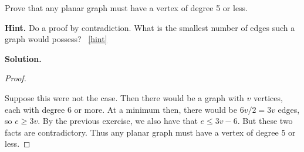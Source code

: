 \documentclass{book}
\begin{document}
\setcounter{project}{31}
\addtocounter{project}{-1}
\begin{activity}[]\label{act-planardeg5}
\hypertarget{p-314}{}%
Prove that any planar graph must have a vertex of degree 5 or less.%
\par\smallskip%
\noindent\textbf{Hint.}\hypertarget{hint-10}{}\quad%
\hypertarget{p-315}{}%
Do a proof by contradiction.  What is the smallest number of edges such a graph would possess?%
~\hfill{\tiny\hyperlink{a-31}{[hint]}\hypertarget{q-31}{}}\par\smallskip%
\noindent\textbf{Solution.}\hypertarget{solution-26}{}\quad%
\begin{proof}\hypertarget{proof-4}{}
\hypertarget{p-316}{}%
Suppose this were not the case. Then there would be a graph with \(v\) vertices, each with degree 6 or more. At a minimum then, there would be \(6v/2 = 3v\) edges, so \(e \ge 3v\). By the previous exercise, we also have that \(e \le 3v - 6\). But these two facts are contradictory. Thus any planar graph must have a vertex of degree 5 or less.%
\end{proof}
\end{activity}
\end{document}
